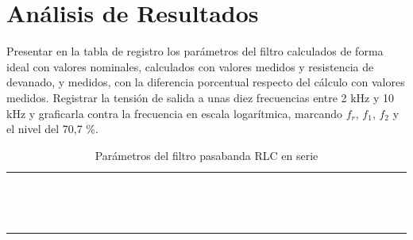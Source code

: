 \documentclass[12pt]{article}
\begin{document}
\section{Análisis de Resultados}\label{sec:analisis}
Presentar en la tabla de registro los parámetros del filtro calculados de forma ideal con valores nominales, calculados con valores medidos y resistencia de devanado, y medidos, con la diferencia porcentual respecto del cálculo con valores medidos.
\lineablanco
Registrar la tensión de salida a unas diez frecuencias entre 2 kHz y 10 kHz y graficarla contra la frecuencia en escala logarítmica, marcando $f_r$, $f_1$, $f_2$ y el nivel del 70,7 \%.
\begin{table}[H]
  \centering
  \caption{Parámetros del filtro pasabanda RLC en serie}
  \label{tab:registro-1}
  \begin{tabularx}{\linewidth}{>{\raggedright\arraybackslash}X>{\raggedright\arraybackslash}X>{\raggedright\arraybackslash}X>{\raggedright\arraybackslash}X>{\raggedright\arraybackslash}X>{\raggedright\arraybackslash}X}
    \rowcolor{iubnavy} \textcolor{white}{\textbf{Parámetro}} & \textcolor{white}{\textbf{Ideal nominal}} & \textcolor{white}{\textbf{Cálculo con medidos}} & \textcolor{white}{\textbf{Medido}} & \textcolor{white}{\textbf{Unidad}} & \textcolor{white}{\textbf{Diferencia (\%)}} \\
    \rule{0pt}{0.8cm} & & & & & \\
    \rowcolor{iubfondogris} \rule{0pt}{0.8cm} & & & & & \\
    \rule{0pt}{0.8cm} & & & & & \\
    \rowcolor{iubfondogris} \rule{0pt}{0.8cm} & & & & & \\
    \rule{0pt}{0.8cm} & & & & & \\
    \rowcolor{iubfondogris} \rule{0pt}{0.8cm} & & & & & \\
    \bottomrule
  \end{tabularx}
\end{table}
\end{document}
